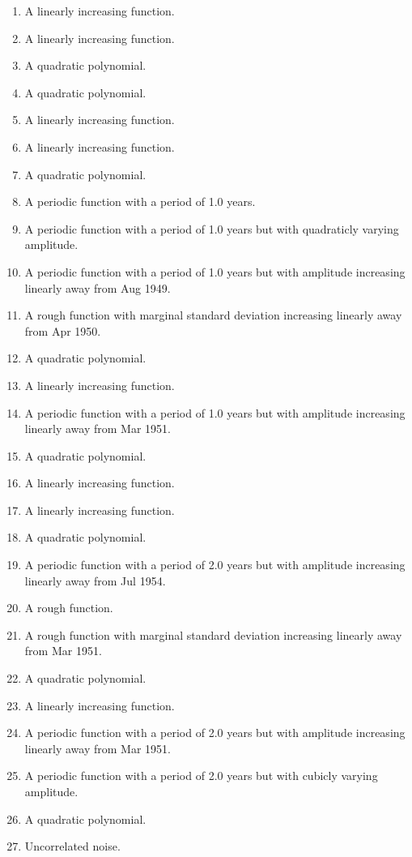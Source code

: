 \documentclass[11pt,a4paper]{article}
\begin{document}
\begin{enumerate}
  \item A linearly increasing function.
  \item A linearly increasing function.
  \item A quadratic polynomial.
  \item A quadratic polynomial.
  \item A linearly increasing function.
  \item A linearly increasing function.
  \item A quadratic polynomial.
  \item A periodic function with a period of 1.0 years.
  \item A periodic function with a period of 1.0 years but with quadraticly varying amplitude.
  \item A periodic function with a period of 1.0 years but with amplitude increasing linearly away from Aug 1949.
  \item A rough function with marginal standard deviation increasing linearly away from Apr 1950.
  \item A quadratic polynomial.
  \item A linearly increasing function.
  \item A periodic function with a period of 1.0 years but with amplitude increasing linearly away from Mar 1951.
  \item A quadratic polynomial.
  \item A linearly increasing function.
  \item A linearly increasing function.
  \item A quadratic polynomial.
  \item A periodic function with a period of 2.0 years but with amplitude increasing linearly away from Jul 1954.
  \item A rough function.
  \item A rough function with marginal standard deviation increasing linearly away from Mar 1951.
  \item A quadratic polynomial.
  \item A linearly increasing function.
  \item A periodic function with a period of 2.0 years but with amplitude increasing linearly away from Mar 1951.
  \item A periodic function with a period of 2.0 years but with cubicly varying amplitude.
  \item A quadratic polynomial.
  \item Uncorrelated noise.

\end{enumerate}
\end{document}
